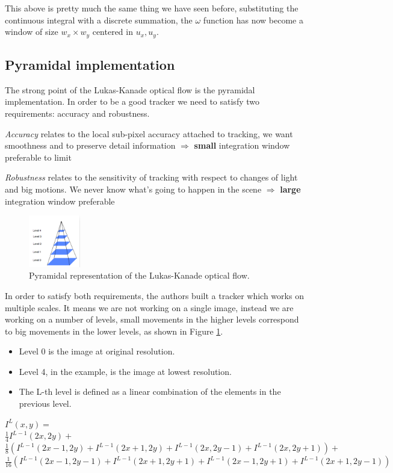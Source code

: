 This above is pretty much the same thing we have seen before, substituting the continuous integral with a discrete summation, the $\omega$ function has now become a window of size $w_x \times w_y$ centered in $u_x, u_y$.

\subsection{Pyramidal implementation}

The strong point of the Lukas-Kanade optical flow is the pyramidal implementation. In order to be a good tracker we need to satisfy two requirements: accuracy and robustness.

\textit{Accuracy} relates to the local sub-pixel accuracy attached to tracking, we want smoothness and to preserve detail information $\Rightarrow$ \textbf{small} integration window preferable to limit

\textit{Robustness} relates to the sensitivity of tracking with respect to changes of light and big motions. We never know what's going to happen in the scene $\Rightarrow$ \textbf{large} integration window preferable

\begin{figure}[H]
    \centering
    \includegraphics[width=0.2\textwidth]{Figures/pyramid.png}
    \caption{Pyramidal representation of the Lukas-Kanade optical flow.}
    \label{img:pyramid}
\end{figure}

In order to satisfy both requirements, the authors built a tracker which works on multiple scales. It means we are not working on a single image, instead we are working on a number of levels, small movements in the higher levels correspond to big movements in the lower levels, as shown in Figure \ref{img:pyramid}.

\begin{itemize}
    \item Level 0 is the image at original resolution.
    \item Level 4, in the example, is the image at lowest resolution.
    \item The L-th level is defined as a linear combination of the elements in the previous level.
\end{itemize}
\(
    I^L(x,y) = 
\)\\
\(
    \frac{1}{4}I^{L-1}(2x, 2y)+
\)\\
\(
    \frac{1}{8}(I^{L-1}(2x-1,2y) + I^{L-1}(2x+1,2y)+I^{L-1}(2x,2y-1)+I^{L-1}(2x,2y+1))+    
\)\\
\(
    \frac{1}{16}(I^{L-1}(2x-1,2y-1) + I^{L-1}(2x+1,2y+1)+I^{L-1}(2x-1,2y+1)+I^{L-1}(2x+1,2y-1))    
\)

